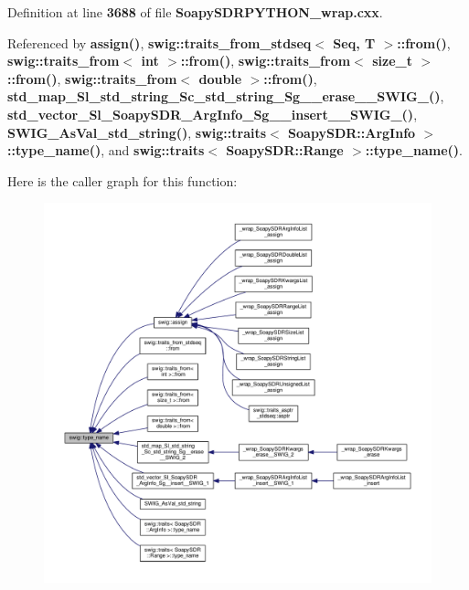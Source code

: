 Definition at line {\bf 3688} of file {\bf Soapy\+S\+D\+R\+P\+Y\+T\+H\+O\+N\+\_\+wrap.\+cxx}.



Referenced by {\bf assign()}, {\bf swig\+::traits\+\_\+from\+\_\+stdseq$<$ Seq, T $>$\+::from()}, {\bf swig\+::traits\+\_\+from$<$ int $>$\+::from()}, {\bf swig\+::traits\+\_\+from$<$ size\+\_\+t $>$\+::from()}, {\bf swig\+::traits\+\_\+from$<$ double $>$\+::from()}, {\bf std\+\_\+map\+\_\+\+Sl\+\_\+std\+\_\+string\+\_\+\+Sc\+\_\+std\+\_\+string\+\_\+\+Sg\+\_\+\+\_\+erase\+\_\+\+\_\+\+S\+W\+I\+G\+\_()}, {\bf std\+\_\+vector\+\_\+\+Sl\+\_\+\+Soapy\+S\+D\+R\+\_\+\+Arg\+Info\+\_\+\+Sg\+\_\+\+\_\+insert\+\_\+\+\_\+\+S\+W\+I\+G\+\_()}, {\bf S\+W\+I\+G\+\_\+\+As\+Val\+\_\+std\+\_\+string()}, {\bf swig\+::traits$<$ Soapy\+S\+D\+R\+::\+Arg\+Info $>$\+::type\+\_\+name()}, and {\bf swig\+::traits$<$ Soapy\+S\+D\+R\+::\+Range $>$\+::type\+\_\+name()}.



Here is the caller graph for this function\+:
\nopagebreak
\begin{figure}[H]
\begin{center}
\leavevmode
\includegraphics[width=350pt]{d3/d99/namespaceswig_ab093146accefc24aa2f3b461ec9932db_icgraph}
\end{center}
\end{figure}


